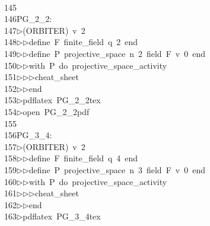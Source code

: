 \begin{tabbing}
\>\\[0pt]
145\>\\[0pt]
146\>PG\_2\_2:\\[0pt]
147\>$\triangleright$\>(ORBITER)\ v\ 2\ \\[0pt]
148\>$\triangleright$\>$\triangleright$\>define\ F\ finite\_field\ q\ 2\ end\ \\[0pt]
149\>$\triangleright$\>$\triangleright$\>define\ P\ projective\_space\ n\ 2\ field\ F\ v\ 0\ end\ \\[0pt]
150\>$\triangleright$\>$\triangleright$\>with\ P\ do\ projective\_space\_activity\ \\[0pt]
151\>$\triangleright$\>$\triangleright$\>$\triangleright$\>cheat\_sheet\ \\[0pt]
152\>$\triangleright$\>$\triangleright$\>end\\[0pt]
153\>$\triangleright$\>pdflatex\ PG\_2\_2tex\ \\[0pt]
154\>$\triangleright$\>open\ PG\_2\_2pdf\\[0pt]
155\>\\[0pt]
156\>PG\_3\_4:\\[0pt]
157\>$\triangleright$\>(ORBITER)\ v\ 2\ \\[0pt]
158\>$\triangleright$\>$\triangleright$\>define\ F\ finite\_field\ q\ 4\ end\ \\[0pt]
159\>$\triangleright$\>$\triangleright$\>define\ P\ projective\_space\ n\ 3\ field\ F\ v\ 0\ end\ \\[0pt]
160\>$\triangleright$\>$\triangleright$\>with\ P\ do\ projective\_space\_activity\ \\[0pt]
161\>$\triangleright$\>$\triangleright$\>$\triangleright$\>cheat\_sheet\ \\[0pt]
162\>$\triangleright$\>$\triangleright$\>end\\[0pt]
163\>$\triangleright$\>pdflatex\ PG\_3\_4tex\ \\[0pt]

\end{tabbing}
